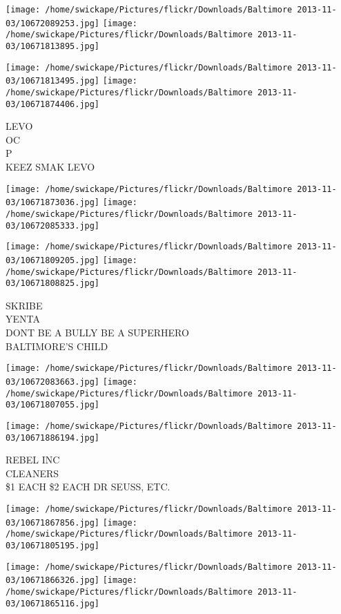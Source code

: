 \documentclass[10pt,letterpaper]{article}
\begin{document}
\texttt{[image: /home/swickape/Pictures/flickr/Downloads/Baltimore 2013-11-03/10672089253.jpg]}
\texttt{[image: /home/swickape/Pictures/flickr/Downloads/Baltimore 2013-11-03/10671813895.jpg]}

\texttt{[image: /home/swickape/Pictures/flickr/Downloads/Baltimore 2013-11-03/10671813495.jpg]}
\texttt{[image: /home/swickape/Pictures/flickr/Downloads/Baltimore 2013-11-03/10671874406.jpg]}

LEVO\\
OC\\
P\\
KEEZ SMAK LEVO\\
\pagebreak

\texttt{[image: /home/swickape/Pictures/flickr/Downloads/Baltimore 2013-11-03/10671873036.jpg]}
\texttt{[image: /home/swickape/Pictures/flickr/Downloads/Baltimore 2013-11-03/10672085333.jpg]}

\texttt{[image: /home/swickape/Pictures/flickr/Downloads/Baltimore 2013-11-03/10671809205.jpg]}
\texttt{[image: /home/swickape/Pictures/flickr/Downloads/Baltimore 2013-11-03/10671808825.jpg]}

SKRIBE\\
YENTA\\
DONT BE A BULLY BE A SUPERHERO\\
BALTIMORE'S CHILD\\
\pagebreak

\texttt{[image: /home/swickape/Pictures/flickr/Downloads/Baltimore 2013-11-03/10672083663.jpg]}
\texttt{[image: /home/swickape/Pictures/flickr/Downloads/Baltimore 2013-11-03/10671807055.jpg]}

\vspace{0.25in}
\texttt{[image: /home/swickape/Pictures/flickr/Downloads/Baltimore 2013-11-03/10671886194.jpg]}

REBEL INC\\
CLEANERS\\
\$1 EACH \$2 EACH DR SEUSS, ETC.\\
\pagebreak

\texttt{[image: /home/swickape/Pictures/flickr/Downloads/Baltimore 2013-11-03/10671867856.jpg]}
\texttt{[image: /home/swickape/Pictures/flickr/Downloads/Baltimore 2013-11-03/10671805195.jpg]}

\texttt{[image: /home/swickape/Pictures/flickr/Downloads/Baltimore 2013-11-03/10671866326.jpg]}
\texttt{[image: /home/swickape/Pictures/flickr/Downloads/Baltimore 2013-11-03/10671865116.jpg]}
\end{document}
